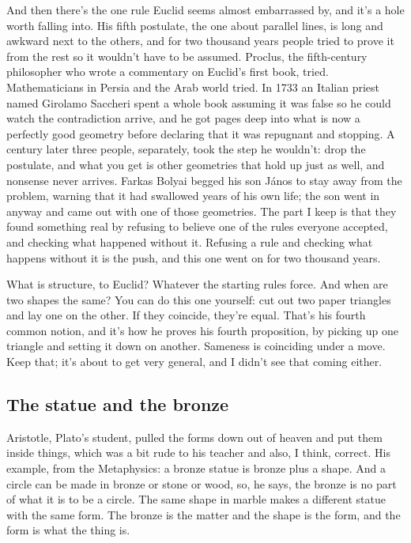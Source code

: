 \documentclass[11pt,twoside]{article}
\theoremstyle{thielethm}
\theoremstyle{thieledef}
\theoremstyle{thieledef}
\theoremstyle{thieledef}
\theoremstyle{thielethm}
\theoremstyle{thieleobs}
\theoremstyle{thielethm}
\begin{document}
And then there's the one rule Euclid seems almost embarrassed by, and it's a hole worth falling into. His fifth postulate, the one about parallel lines, is long and awkward next to the others, and for two thousand years people tried to prove it from the rest so it wouldn't have to be assumed. Proclus, the fifth-century philosopher who wrote a commentary on Euclid's first book, tried. Mathematicians in Persia and the Arab world tried. In 1733 an Italian priest named Girolamo Saccheri spent a whole book assuming it was false so he could watch the contradiction arrive, and he got pages deep into what is now a perfectly good geometry before declaring that it was repugnant and stopping. A century later three people, separately, took the step he wouldn't: drop the postulate, and what you get is other geometries that hold up just as well, and nonsense never arrives. Farkas Bolyai begged his son János to stay away from the problem, warning that it had swallowed years of his own life; the son went in anyway and came out with one of those geometries. The part I keep is that they found something real by refusing to believe one of the rules everyone accepted, and checking what happened without it. Refusing a rule and checking what happens without it is the push, and this one went on for two thousand years.

What is structure, to Euclid? Whatever the starting rules force. And when are two shapes the same? You can do this one yourself: cut out two paper triangles and lay one on the other. If they coincide, they're equal. That's his fourth common notion, and it's how he proves his fourth proposition, by picking up one triangle and setting it down on another. Sameness is coinciding under a move. Keep that; it's about to get very general, and I didn't see that coming either.

\subsection{The statue and the bronze}

Aristotle, Plato's student, pulled the forms down out of heaven and put them inside things, which was a bit rude to his teacher and also, I think, correct. His example, from the Metaphysics: a bronze statue is bronze plus a shape. And a circle can be made in bronze or stone or wood, so, he says, the bronze is no part of what it is to be a circle. The same shape in marble makes a different statue with the same form. The bronze is the matter and the shape is the form, and the form is what the thing is.
\end{document}
